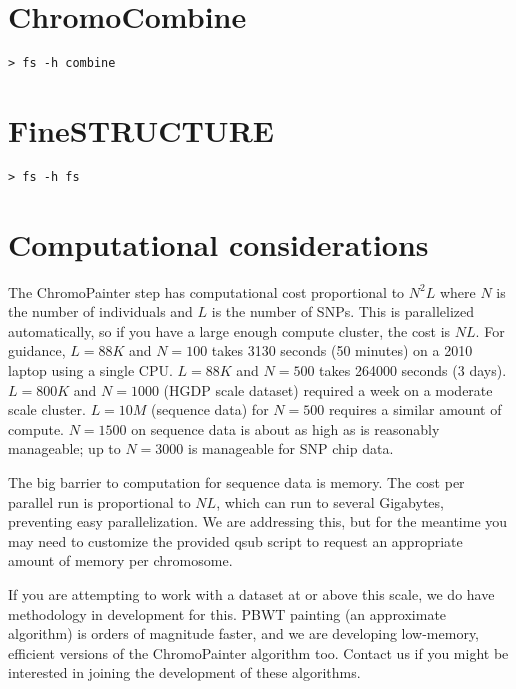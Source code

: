 \documentclass[11pt]{article}
\begin{document}
\section{ChromoCombine}
\begin{lstlisting}[caption=ChromoCombine help]
> fs -h combine
\end{lstlisting}


\section{FineSTRUCTURE}
\begin{lstlisting}[caption=FineSTRUCTURE help]
> fs -h fs
\end{lstlisting}


\section{Computational considerations}

The ChromoPainter step has computational cost proportional to $N^2 L$ where $N$ is the number of individuals and $L$ is the number of SNPs.  This is parallelized automatically, so if you have a large enough compute cluster, the cost is $NL$. For guidance, $L=88K$ and $N=100$ takes 3130 seconds (50 minutes) on a 2010 laptop using a single CPU. $L=88K$ and $N=500$ takes 264000 seconds (3 days). $L=800K$ and $N=1000$ (HGDP scale dataset) required a week on a moderate scale cluster. $L=10M$ (sequence data) for $N=500$ requires a similar amount of compute.  $N=1500$ on sequence data is about as high as is reasonably manageable; up to $N=3000$ is manageable for SNP chip data.

The big barrier to computation for sequence data is memory. The cost per parallel run is proportional to $NL$, which can run to several Gigabytes, preventing easy parallelization. We are addressing this, but for the meantime you may need to customize the provided qsub script to request an appropriate amount of memory per chromosome.

If you are attempting to work with a dataset at or above this scale, we do have methodology in development for this. PBWT painting (an approximate algorithm) is orders of magnitude faster, and we are developing low-memory, efficient versions of the ChromoPainter algorithm too. Contact us if you might be interested in joining the development of these algorithms.
\end{document}
